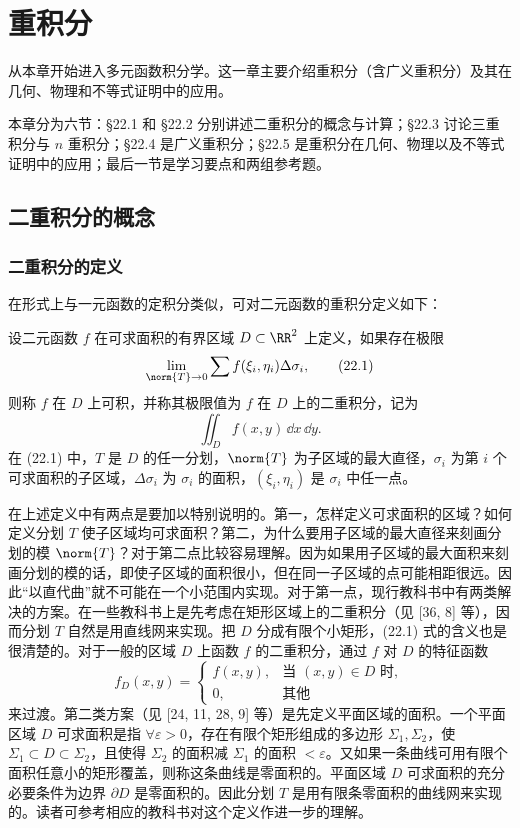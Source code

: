 \chapter{重积分}

从本章开始进入多元函数积分学。这一章主要介绍重积分（含广义重积分）及其在几何、物理和不等式证明中的应用。

本章分为六节：§22.1 和 §22.2 分别讲述二重积分的概念与计算；§22.3 讨论三重积分与 $n$ 重积分；§22.4 是广义重积分；§22.5 是重积分在几何、物理以及不等式证明中的应用；最后一节是学习要点和两组参考题。

\section{二重积分的概念}

\subsection{二重积分的定义}

在形式上与一元函数的定积分类似，可对二元函数的重积分定义如下：

设二元函数 $f$ 在可求面积的有界区域 $D\subset\RR^2$ 上定义，如果存在极限
\begin{equation}
  \lim_{\norm{T}\to0}\sum f(\xi_i,\eta_i)\Delta\sigma_i,
  \tag{22.1}
  \label{eq:22.1}
\end{equation}
则称 $f$ 在 $D$ 上可积，并称其极限值为 $f$ 在 $D$ 上的二重积分，记为
\[
  \iint_D f(x,y)\,\dd x\,\dd y.
\]
在 (22.1) 中，$T$ 是 $D$ 的任一分划，$\norm{T}$ 为子区域的最大直径，$\sigma_i$ 为第 $i$ 个可求面积的子区域，$\Delta\sigma_i$ 为 $\sigma_i$ 的面积，$(\xi_i,\eta_i)$ 是 $\sigma_i$ 中任一点。

在上述定义中有两点是要加以特别说明的。第一，怎样定义可求面积的区域？如何定义分划 $T$ 使子区域均可求面积？第二，为什么要用子区域的最大直径来刻画分划的模 $\norm{T}$？对于第二点比较容易理解。因为如果用子区域的最大面积来刻画分划的模的话，即使子区域的面积很小，但在同一子区域的点可能相距很远。因此“以直代曲”就不可能在一个小范围内实现。对于第一点，现行教科书中有两类解决的方案。在一些教科书上是先考虑在矩形区域上的二重积分（见 [36, 8] 等），因而分划 $T$ 自然是用直线网来实现。把 $D$ 分成有限个小矩形，(22.1) 式的含义也是很清楚的。对于一般的区域 $D$ 上函数 $f$ 的二重积分，通过 $f$ 对 $D$ 的特征函数
\[
  f_D(x,y)=
  \begin{cases}
    f(x,y), & \text{当 }(x,y)\in D\text{ 时},\\
    0, & \text{其他}
  \end{cases}
\]
来过渡。第二类方案（见 [24, 11, 28, 9] 等）是先定义平面区域的面积。一个平面区域 $D$ 可求面积是指 $\forall\varepsilon>0$，存在有限个矩形组成的多边形 $\Sigma_1,\Sigma_2$，使 $\Sigma_1\subset D\subset\Sigma_2$，且使得 $\Sigma_2$ 的面积减 $\Sigma_1$ 的面积 $<\varepsilon$。又如果一条曲线可用有限个面积任意小的矩形覆盖，则称这条曲线是零面积的。平面区域 $D$ 可求面积的充分必要条件为边界 $\partial D$ 是零面积的。因此分划 $T$ 是用有限条零面积的曲线网来实现的。读者可参考相应的教科书对这个定义作进一步的理解。

